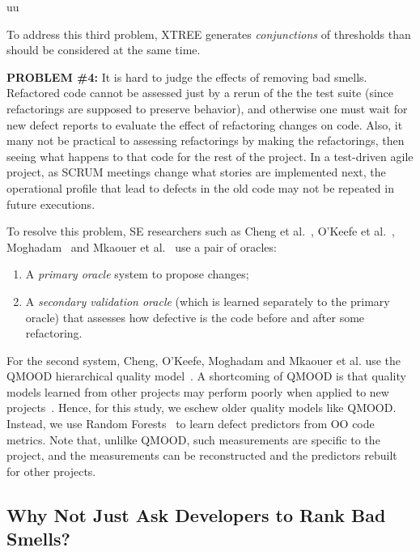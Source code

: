 uu \documentclass[final,twocolumn,5p]{elsarticle}
\theoremstyle{break}
\begin{document}
To address this third problem, 
XTREE   generates {\em conjunctions} of   thresholds
than should  be considered at the same time.

 
{\bf PROBLEM \#4:} It is hard to judge the  effects of removing bad smells.
Refactored code cannot be assessed just by a rerun of the the test
suite (since refactorings are supposed to preserve behavior), and otherwise one must wait for new defect reports to evaluate the effect of refactoring changes on code.  
Also, it many not be practical
 to assessing refactorings by making the
refactorings,  then seeing what happens to that code for the rest
of the project. In a test-driven agile project, as
SCRUM meetings change what stories are implemented next,
the operational profile that lead to defects in the old
code may not be repeated in future executions. 

To resolve this  problem, SE researchers such as 
Cheng et al.~\cite{Cheng10}, O'Keefe et al.~\cite{OKeeffe08,OKeeffe07},
Moghadam~\cite{Moghadam2011} and Mkaouer et al.~\cite{Mkaouer14}
use a pair of oracles: 
\begin{enumerate}
    \item A {\em primary oracle} system to propose changes;
\item A {\em secondary validation oracle} (which is learned separately
to the primary oracle) that   assesses
how defective is the code before and after some
refactoring.
\end{enumerate}
For the second system,
 Cheng, O'Keefe, Moghadam and  Mkaouer et al. use the QMOOD hierarchical
quality model~\cite{Bansiya02}.
A shortcoming of QMOOD
is that quality models learned from other projects
may perform poorly when applied to new projects~\cite{localvsglobal}.
Hence, for this study, we  eschew
older quality models like QMOOD. Instead, we use
Random Forests~\cite{Breiman2001} to learn defect predictors
from OO code metrics.
Note that, unlilke QMOOD, such measurements 
  are specific to the project, and the measurements can be reconstructed and the predictors rebuilt for other projects.
  
  




\subsection{Why Not Just Ask Developers to Rank Bad Smells?}\label{sect:prelim}
\end{document}
